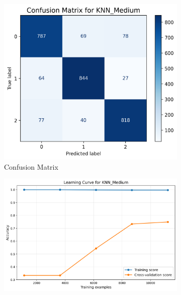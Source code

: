 \documentclass[10pt]{article}
\begin{document}
    \begin{figure}[!ht]
        \begin{subfigure}{0.33\textwidth}
            \centering
            \includegraphics[width=\textwidth]{code/ResultsMainAugZip/plots/Block2_KNN_Variants_Experiment_I/confusion_matrix_KNN_Medium.png}
            \caption{Confusion Matrix}
        \end{subfigure}
        \begin{subfigure}{0.33\textwidth}
            \centering
            \includegraphics[width=\textwidth]{code/ResultsMainAugZip/plots/Block2_KNN_Variants_Experiment_I/learning_curve_KNN_Medium.png}

\end{subfigure}
\end{figure}
\end{document}
